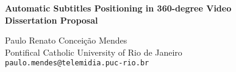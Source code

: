 \documentclass[11pt]{article}
\begin{document}
\LARGE


\begin{center}
{\bf Automatic Subtitles Positioning in 360-degree Video
\Large
\\Dissertation Proposal}
\end{center}


\bigskip
\normalsize

\begin{flushright}

Paulo Renato Conceição Mendes\\
Pontifical Catholic University of Rio de Janeiro\\
\texttt{paulo.mendes@telemidia.puc-rio.br}
\end{flushright}


\date{}


\thispagestyle{empty}

%
%

{} \setcounter{page}{-1}

\tableofcontents

\newpage
{} \setcounter{page}{1}







\newpage


% 

\end{document}

